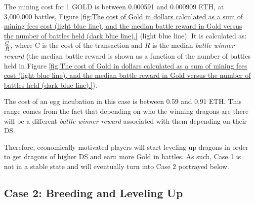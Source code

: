 \documentclass[12pt]{article}
\begin{document}
{The mining cost for 1 GOLD is between 0.000591 and 0.000909 ETH, at 3,000,000 battles, Figure \ref{fig:The cost of Gold in dollars calculated as a sum of mining fees cost (light blue line), and the median battle reward in Gold versus the number of battles held (dark blue line).} (light blue line).  It is calculated as:  ${{C}\over{\bar R}}$, where C is the cost of the transaction and  $\bar R$ is the median \textit{battle winner reward} (the median battle reward is shown as a function of the number of battles held in Figure \ref{fig:The cost of Gold in dollars calculated as a sum of mining fees cost (light blue line), and the median battle reward in Gold versus the number of battles held (dark blue line).}).\par

The cost of an egg incubation in this case is between 0.59 and 0.91 ETH. This range comes from the fact that depending on who the winning dragons are there will be a different \textit{battle winner reward} associated with them depending on their DS.\par

Therefore, economically motivated players will start leveling up dragons in order to get dragons of higher DS and earn more Gold in battles. As such, Case 1 is not in a stable state and will eventually turn into Case 2 portrayed below.\par


\subsection{Case 2: Breeding and Leveling Up}
\label{Case 2: Breeding and Leveling Up} \par




}
\end{document}
